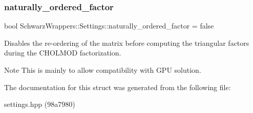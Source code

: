 \subsubsection{\texorpdfstring{naturally\+\_\+ordered\+\_\+factor}{naturally\_ordered\_factor}}
{\footnotesize\ttfamily bool Schwarz\+Wrappers\+::\+Settings\+::naturally\+\_\+ordered\+\_\+factor = false}



Disables the re-\/ordering of the matrix before computing the triangular factors during the C\+H\+O\+L\+M\+OD factorization. 

\begin{DoxyNote}{Note}
This is mainly to allow compatibility with G\+PU solution. 
\end{DoxyNote}


The documentation for this struct was generated from the following file\+:\begin{DoxyCompactItemize}
\item 
settings.\+hpp (98a7980)\end{DoxyCompactItemize}
